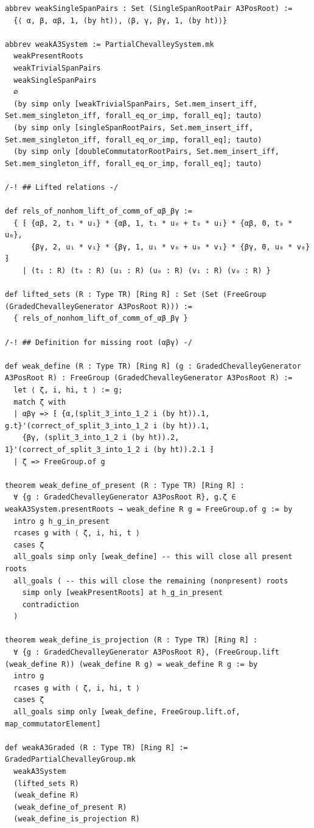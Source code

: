 \begin{Verbatim}
abbrev weakSingleSpanPairs : Set (SingleSpanRootPair A3PosRoot) :=
  {⟨ α, β, αβ, 1, (by ht)⟩, ⟨β, γ, βγ, 1, (by ht)⟩}

abbrev weakA3System := PartialChevalleySystem.mk
  weakPresentRoots
  weakTrivialSpanPairs
  weakSingleSpanPairs
  ∅
  (by simp only [weakTrivialSpanPairs, Set.mem_insert_iff, Set.mem_singleton_iff, forall_eq_or_imp, forall_eq]; tauto)
  (by simp only [singleSpanRootPairs, Set.mem_insert_iff, Set.mem_singleton_iff, forall_eq_or_imp, forall_eq]; tauto)
  (by simp only [doubleCommutatorRootPairs, Set.mem_insert_iff, Set.mem_singleton_iff, forall_eq_or_imp, forall_eq]; tauto)

/-! ## Lifted relations -/

def rels_of_nonhom_lift_of_comm_of_αβ_βγ :=
  { ⁅ {αβ, 2, t₁ * u₁} * {αβ, 1, t₁ * u₀ + t₀ * u₁} * {αβ, 0, t₀ * u₀},
      {βγ, 2, u₁ * v₁} * {βγ, 1, u₁ * v₀ + u₀ * v₁} * {βγ, 0, u₀ * v₀} ⁆
    | (t₁ : R) (t₀ : R) (u₁ : R) (u₀ : R) (v₁ : R) (v₀ : R) }

def lifted_sets (R : Type TR) [Ring R] : Set (Set (FreeGroup (GradedChevalleyGenerator A3PosRoot R))) :=
  { rels_of_nonhom_lift_of_comm_of_αβ_βγ }

/-! ## Definition for missing root (αβγ) -/

def weak_define (R : Type TR) [Ring R] (g : GradedChevalleyGenerator A3PosRoot R) : FreeGroup (GradedChevalleyGenerator A3PosRoot R) :=
  let ⟨ ζ, i, hi, t ⟩ := g;
  match ζ with
  | αβγ => ⁅ {α,(split_3_into_1_2 i (by ht)).1, g.t}'(correct_of_split_3_into_1_2 i (by ht)).1,
    {βγ, (split_3_into_1_2 i (by ht)).2, 1}'(correct_of_split_3_into_1_2 i (by ht)).2.1 ⁆
  | ζ => FreeGroup.of g

theorem weak_define_of_present (R : Type TR) [Ring R] :
  ∀ {g : GradedChevalleyGenerator A3PosRoot R}, g.ζ ∈ weakA3System.presentRoots → weak_define R g = FreeGroup.of g := by
  intro g h_g_in_present
  rcases g with ⟨ ζ, i, hi, t ⟩
  cases ζ
  all_goals simp only [weak_define] -- this will close all present roots
  all_goals ( -- this will close the remaining (nonpresent) roots
    simp only [weakPresentRoots] at h_g_in_present
    contradiction
  )

theorem weak_define_is_projection (R : Type TR) [Ring R] :
  ∀ {g : GradedChevalleyGenerator A3PosRoot R}, (FreeGroup.lift (weak_define R)) (weak_define R g) = weak_define R g := by
  intro g
  rcases g with ⟨ ζ, i, hi, t ⟩
  cases ζ
  all_goals simp only [weak_define, FreeGroup.lift.of, map_commutatorElement]

def weakA3Graded (R : Type TR) [Ring R] := GradedPartialChevalleyGroup.mk
  weakA3System
  (lifted_sets R)
  (weak_define R)
  (weak_define_of_present R)
  (weak_define_is_projection R)


\end{Verbatim}
